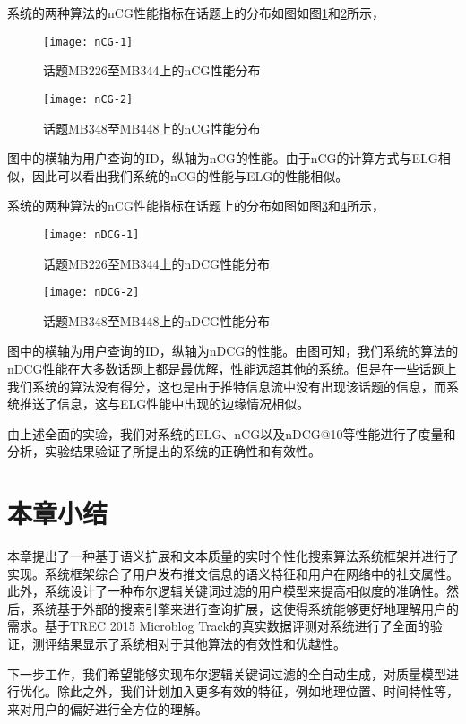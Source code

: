 系统的两种算法的nCG性能指标在话题上的分布如图如图\ref{fig:ncg1}和\ref{fig:ncg2}所示，
\begin{figure}[!htbp]
  \centering
  \texttt{[image: nCG-1]}
  \caption{话题MB226至MB344上的nCG性能分布}
  \label{fig:ncg1}
\end{figure}
\begin{figure}[!htbp]
  \centering
  \texttt{[image: nCG-2]}
  \caption{话题MB348至MB448上的nCG性能分布}
  \label{fig:ncg2}
\end{figure}
图中的横轴为用户查询的ID，纵轴为nCG的性能。由于nCG的计算方式与ELG相似，因此可以看出我们系统的nCG的性能与ELG的性能相似。

系统的两种算法的nCG性能指标在话题上的分布如图如图\ref{fig:ndcg1}和\ref{fig:ndcg2}所示，
\begin{figure}[!htbp]
  \centering
  \texttt{[image: nDCG-1]}
  \caption{话题MB226至MB344上的nDCG性能分布}
  \label{fig:ndcg1}
\end{figure}
\begin{figure}[!htbp]
  \centering
  \texttt{[image: nDCG-2]}
  \caption{话题MB348至MB448上的nDCG性能分布}
  \label{fig:ndcg2}
\end{figure}
图中的横轴为用户查询的ID，纵轴为nDCG的性能。由图可知，我们系统的算法的nDCG性能在大多数话题上都是最优解，性能远超其他的系统。但是在一些话题上我们系统的算法没有得分，这也是由于推特信息流中没有出现该话题的信息，而系统推送了信息，这与ELG性能中出现的边缘情况相似。

由上述全面的实验，我们对系统的ELG、nCG以及nDCG@10等性能进行了度量和分析，实验结果验证了所提出的系统的正确性和有效性。
\section{本章小结}
\label{sec2:conclusion}
本章提出了一种基于语义扩展和文本质量的实时个性化搜索算法系统框架并进行了实现。系统框架综合了用户发布推文信息的语义特征和用户在网络中的社交属性。此外，系统设计了一种布尔逻辑关键词过滤的用户模型来提高相似度的准确性。然后，系统基于外部的搜索引擎来进行查询扩展，这使得系统能够更好地理解用户的需求。基于TREC 2015 Microblog Track的真实数据评测对系统进行了全面的验证，测评结果显示了系统相对于其他算法的有效性和优越性。

下一步工作，我们希望能够实现布尔逻辑关键词过滤的全自动生成，对质量模型进行优化。除此之外，我们计划加入更多有效的特征，例如地理位置、时间特性等，来对用户的偏好进行全方位的理解。


